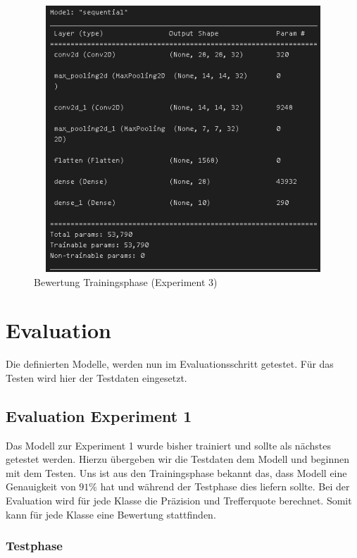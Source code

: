 \documentclass[12pt]{scrreprt}
\begin{document}
\begin{figure}[h!]
	\centering
	\includegraphics[width=13.5cm,height=10cm]		{ExperimentModelAufbau_1.png}
	\caption{ Bewertung Trainingsphase \cite{HK22}(Experiment 3)}
	\label{fig:fig17}
\end{figure}


\section{Evaluation}\label{eval:eval}

Die definierten Modelle, werden nun im Evaluationsschritt getestet. Für das Testen wird hier der Testdaten eingesetzt.

\subsection{Evaluation Experiment 1}\label{eval:eval1}

Das Modell zur Experiment 1 wurde bisher trainiert und sollte als nächstes getestet werden. Hierzu übergeben wir die Testdaten dem Modell und beginnen mit dem Testen. Uns ist aus den Trainingsphase bekannt das, dass Modell eine Genauigkeit von $91\%$ hat und während der Testphase dies liefern sollte. Bei der Evaluation wird für jede Klasse die Präzision und Trefferquote berechnet. Somit kann für jede Klasse eine Bewertung stattfinden.

\subsubsection{Testphase}
\end{document}
